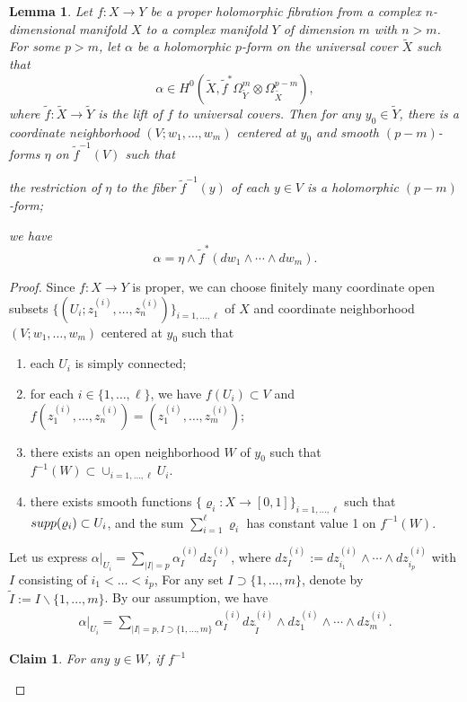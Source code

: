 \documentclass[11pt,a4paper,english]{smfart}
\theoremstyle{plain}
\newtheorem{claim}[theorem]{Claim}
\newtheorem{lemma}[theorem]{Lemma}
\theoremstyle{definition}
\theoremstyle{plain}
\begin{document}
	\iffalse
	\begin{lemma}
		Let $f:X\to Y$ be a proper holomorphic fibration from a complex $n$-dimensional manifold $X$  to a complex manifold $Y$ of dimension $m$ with $n>m$. For some $p>m$, let $\alpha$ be a holomorphic $p$-form on the universal cover $\widetilde{X}$ such that $$\alpha\in H^0(\widetilde{X},\tilde{f}^*\Omega_{\widetilde{Y}}^m\otimes \Omega_{\widetilde{X}}^{p-m}),$$
		where $\tilde{f}:\widetilde{X}\to\widetilde{Y}$ is the lift of $f$ to   universal covers.  Then for any $y_0\in \widetilde{Y}$, there is a coordinate neighborhood $(V;w_1,\ldots,w_m)$ centered at $y_0$ and smooth $(p-m)$-forms $\eta$ on $\tilde{f}^{-1}(V)$  such that
		\begin{thmlist}
			\item the restriction of $\eta$ to the fiber $\tilde{f}^{-1}(y)$  of each $y\in V$ is  a holomorphic $(p-m)$-form;
			\item we have
			$$\alpha=\eta\wedge \tilde{f}^*(dw_1\wedge \cdots\wedge dw_m).$$
		\end{thmlist}
	\end{lemma}
	\begin{proof}
		Since $f:X\to Y$ is proper, we can choose finitely many coordinate open subsets $\{(U_i;z^{(i)}_1,\ldots,z^{(i)}_n)\}_{i=1,\ldots,\ell}$ of $X$ and coordinate neighborhood $(V;w_1,\ldots,w_m)$ centered at $y_0$ such that 
		\begin{enumerate}
			\item each $U_i$ is simply connected;
			\item for each $i\in \{1,\ldots,\ell\}$, we have $f(U_i)\subset V$  and
			$f(z^{(i)}_1,\ldots,z^{(i)}_n)=(z^{(i)}_1,\ldots,z^{(i)}_m)$;
			\item there exists an open neighborhood $W$ of $y_0$ such that $f^{-1}(W)\subset \cup_{i=1,\ldots,\ell}U_i$.    
		\item there exists smooth functions $\{\varrho_i:X\to [0,1]\}_{i=1,\ldots,\ell}$ such that ${\rm supp}(\varrho_i)\subset U_i$, and  the sum $\sum_{i=1}^{\ell}\varrho_i$ has constant value 1 on $f^{-1}(W)$.
		\end{enumerate}
Let us express  
	$\alpha|_{U_i}=\sum_{|I|=p}\alpha^{(i)}_I dz^{(i)}_I$, where $dz^{(i)}_I:=  dz^{(i)}_{i_1}\wedge \cdots \wedge dz^{(i)}_{i_p}$ with  $I$  consisting of $i_1<\ldots<i_p$, 	 
	 For any set $I\supset\{1,\ldots,m\}$,  denote by $\tilde{I}:=I\backslash\{1,\ldots,m\}$.   By our assumption, we have
	\begin{align} 
		\alpha|_{U_i}=\sum_{|I|=p,I\supset\{1,\ldots,m\}}\alpha^{(i)}_Idz^{(i)}_{\tilde{I}}\wedge dz^{(i)}_1\wedge \cdots\wedge dz^{(i)}_m.
	\end{align} 
\begin{claim}
	For any $y\in W$, if $f^{-1}$
\end{claim}
		
		
			\end{proof}
\end{document}
